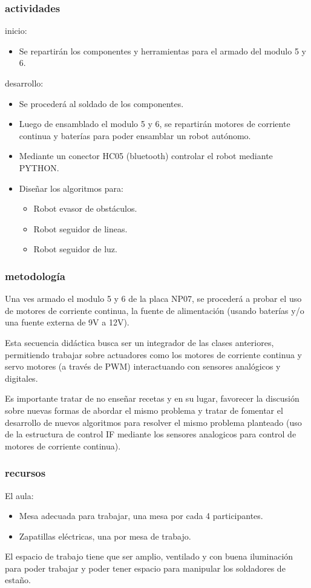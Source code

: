 \subsubsection{actividades}
inicio:
\begin{itemize}
  \item Se repartirán los componentes y herramientas para el armado del modulo 5 y 6.
\end{itemize}
desarrollo:
\begin{itemize}
  \item Se procederá al soldado de los componentes. 
  \item Luego de ensamblado el modulo 5 y 6, se repartirán motores de corriente continua y baterías para poder ensamblar un robot autónomo.
  \item Mediante un conector HC05 (bluetooth) controlar el robot mediante PYTHON.
  \item Diseñar los algoritmos para: 
  \begin{itemize}
    \item Robot evasor de obstáculos.
    \item Robot seguidor de lineas.
    \item Robot seguidor de luz.
  \end{itemize}
  
\end{itemize}

\subsubsection{metodología}

Una ves armado el modulo 5 y 6 de la placa NP07, se procederá a probar el uso de motores de corriente continua, la fuente de alimentación (usando baterías y/o una fuente externa de 9V a 12V).

Esta secuencia didáctica busca ser un integrador de las clases anteriores, permitiendo trabajar sobre actuadores como los motores de corriente continua y servo motores (a través de PWM) interactuando con sensores analógicos y digitales. 

Es importante tratar de no enseñar recetas y en su lugar, favorecer la discusión sobre nuevas formas de abordar el mismo problema y tratar de fomentar el desarrollo de nuevos algoritmos para resolver el mismo problema planteado (uso de la estructura de control IF mediante los sensores analogicos para control de motores de corriente continua).

\subsubsection{recursos}
El aula:
\begin{itemize}
  \item Mesa adecuada para trabajar, una mesa por cada 4 participantes.
  \item Zapatillas eléctricas, una por mesa de trabajo.
\end{itemize}
El espacio de trabajo tiene que ser amplio, ventilado y con buena iluminación para poder trabajar y poder tener espacio para manipular los soldadores de estaño.    


